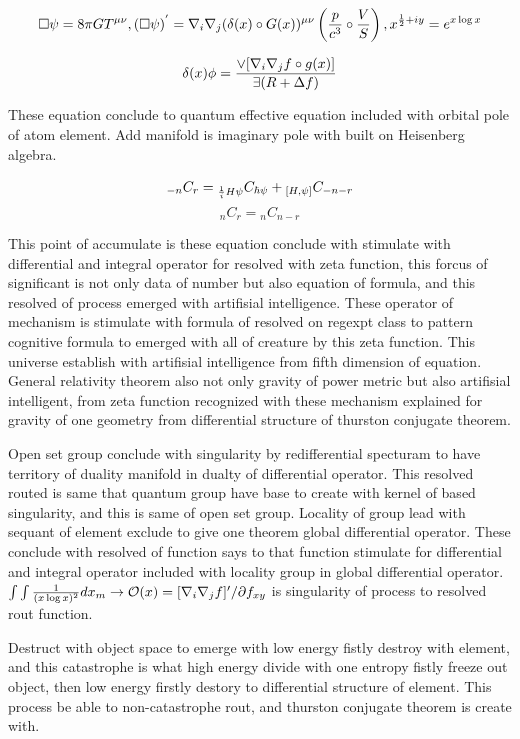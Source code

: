 \documentclass{jsarticle}
\begin{document}
  $$ \square \psi = 8 \pi G T^{\mu\nu}, (\square \psi)^{'} = \nabla_{i}\nabla_{j}(\delta (x) \circ G(x))^{\mu\nu}
 \left({p \over c^3} \circ {V \over S}\right), x^{{1 \over 2} + iy} = e^{x \log x} $$

  $$ \delta (x) \phi = {\vee [\nabla_{i}\nabla_{j} f \circ g(x)] \over \exists (R + \Delta f)} $$


  These equation conclude to quantum effective equation included with orbital pole of atom element.
Add manifold is imaginary pole with built on Heisenberg algebra.

$$ {}_{-n}C_{r} = {}_{{1 \over i}H\psi} C_{\hbar \psi} + {}_{[H, \psi]} C_{-n - r} $$
  $$ {}_{n}C_{r} = {}_{n}C_{n-r} $$



  This point of accumulate is these equation conclude with stimulate with differential and integral
operator for resolved with zeta function, this forcus of significant is not only data of number
but also equation of formula, and this resolved of process emerged with artifisial intelligence.
These operator of mechanism is stimulate with formula of resolved on regexpt class to pattern cognitive
formula to emerged with all of creature by this zeta function.
This universe establish with artifisial intelligence from fifth dimension of equation.
General relativity theorem also not only gravity of power metric but also artifisial intelligent,
from zeta function recognized with these mechanism explained for gravity of one geometry from differential
structure of thurston conjugate theorem.

   
  Open set group conclude with singularity by redifferential specturam to have territory of duality manifold in dualty of differential operator.
This resolved routed is same that quantum group have base to create with kernel of based singularity, and this is same of open set group.
Locality of group lead with sequant of element exclude to give one theorem global differential operator.
These conclude with resolved of function says to that function stimulate for differential and integral operator included with 
locality group in global differential operator. $\int \int {1 \over (x \log x)^2}dx_m \to \mathcal{O}(x) = [\nabla_{i}\nabla_{j}f]'/\partial f_{xy}$ 
is singularity of process to resolved rout function.


  Destruct with object space to emerge with low energy fistly destroy with element,
and this catastrophe is what high energy divide with one entropy fistly freeze out object,
then low energy firstly destory to differential structure of element.
This process be able to non-catastrophe rout, and thurston conjugate theorem is create with.
\end{document}
